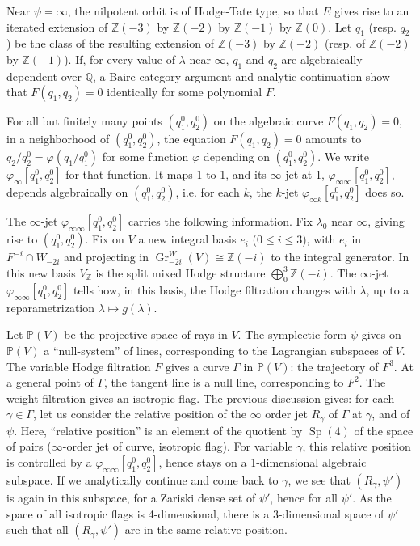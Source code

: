 \documentclass[11pt,a4paper]{article}
\theoremstyle{plain}
\theoremstyle{definition}
\DeclareMathOperator{\Gr}{Gr}
\DeclareMathOperator{\Sp}{Sp}
\begin{document}
Near $\psi = \infty$, the nilpotent orbit is of Hodge-Tate type, so that $E$ gives rise to an iterated extension of $\mathbb{Z}(-3)$ by $\mathbb{Z}(-2)$ by $\mathbb{Z}(-1)$ by $\mathbb{Z}(0)$. Let $q_{1}$ (resp. $q_{2}$) be the class of the resulting extension of $\mathbb{Z}(-3)$ by $\mathbb{Z}(-2)$ (resp. of $\mathbb{Z}(-2)$ by $\mathbb{Z}(-1)$). If, for every value of $\lambda$ near $\infty$, $q_{1}$ and $q_{2}$ are algebraically dependent over $\mathbb{Q}$, a Baire category argument and analytic continuation show that $F(q_{1}, q_{2}) = 0$ identically for some polynomial $F$.

For all but finitely many points $(q_{1}^{0}, q_{2}^{0})$ on the algebraic curve $F(q_{1}, q_{2}) = 0$, in a neighborhood of $(q_{1}^{0}, q_{2}^{0})$, the equation $F(q_{1}, q_{2}) = 0$ amounts to $q_{2}/q_{2}^{0} = \varphi(q_{1}/q_{1}^{0})$ for some function $\varphi$ depending on $(q_{1}^{0}, q_{2}^{0})$. We write $\varphi_{\infty}[q_{1}^{0}, q_{2}^{0}]$ for that function. It maps 1 to 1, and its $\infty$-jet at 1, $\varphi_{\infty\infty}[q_{1}^{0}, q_{2}^{0}]$, depends algebraically on $(q_{1}^{0}, q_{2}^{0})$, i.e. for each $k$, the $k$-jet $\varphi_{\infty k}[q_{1}^{0}, q_{2}^{0}]$ does so.

The $\infty$-jet $\varphi_{\infty\infty}[q_{1}^{0}, q_{2}^{0}]$ carries the following information. Fix $\lambda_{0}$ near $\infty$, giving rise to $(q_{1}^{0}, q_{2}^{0})$. Fix on $V$ a new integral basis $e_{i}$ ($0 \leq i \leq 3$), with $e_{i}$ in $F^{-i} \cap W_{-2i}$ and projecting in $\Gr_{-2i}^{W}(V) \cong \mathbb{Z}(-i)$ to the integral generator. In this new basis $V_{\mathbb{Z}}$ is the split mixed Hodge structure $\bigoplus_{0}^{3} \mathbb{Z}(-i)$. The $\infty$-jet $\varphi_{\infty\infty}[q_{1}^{0}, q_{2}^{0}]$ tells how, in this basis, the Hodge filtration changes with $\lambda$, up to a reparametrization $\lambda \mapsto g(\lambda)$.

Let $\mathbb{P}(V)$ be the projective space of rays in $V$. The symplectic form $\psi$ gives on $\mathbb{P}(V)$ a ``null-system'' of lines, corresponding to the Lagrangian subspaces of $V$. The variable Hodge filtration $F$ gives a curve $\Gamma$ in $\mathbb{P}(V)$: the trajectory of $F^{3}$. At a general point of $\Gamma$, the tangent line is a null line, corresponding to $F^{2}$. The weight filtration gives an isotropic flag. The previous discussion gives: for each $\gamma \in \Gamma$, let us consider the relative position of the $\infty$ order jet $R_{\gamma}$ of $\Gamma$ at $\gamma$, and of $\psi$. Here, ``relative position'' is an element of the quotient by $\Sp(4)$ of the space of pairs ($\infty$-order jet of curve, isotropic flag). For variable $\gamma$, this relative position is controlled by a $\varphi_{\infty\infty}[q_{1}^{0}, q_{2}^{0}]$, hence stays on a 1-dimensional algebraic subspace. If we analytically continue and come back to $\gamma$, we see that $(R_{\gamma}, \psi')$ is again in this subspace, for a Zariski dense set of $\psi'$, hence for all $\psi'$. As the space of all isotropic flags is 4-dimensional, there is a 3-dimensional space of $\psi'$ such that all $(R_{\gamma}, \psi')$ are in the same relative position.
\end{document}
